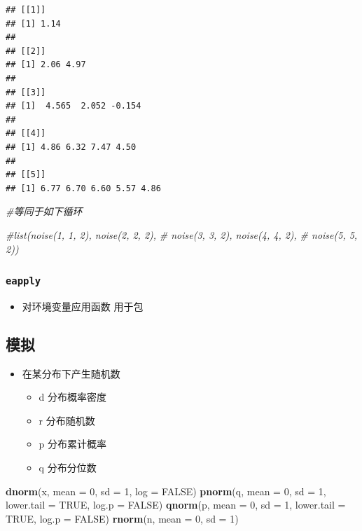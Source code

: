 \documentclass[]{book}
\newenvironment{Shaded}{\begin{snugshade}}{\end{snugshade}}
\newcommand{\CommentTok}[1]{\textcolor[rgb]{0.56,0.35,0.01}{\textit{#1}}}
\newcommand{\DataTypeTok}[1]{\textcolor[rgb]{0.13,0.29,0.53}{#1}}
\newcommand{\DecValTok}[1]{\textcolor[rgb]{0.00,0.00,0.81}{#1}}
\newcommand{\KeywordTok}[1]{\textcolor[rgb]{0.13,0.29,0.53}{\textbf{#1}}}
\newcommand{\NormalTok}[1]{#1}
\newcommand{\OtherTok}[1]{\textcolor[rgb]{0.56,0.35,0.01}{#1}}
\providecommand{\tightlist}{%
  \setlength{\itemsep}{0pt}\setlength{\parskip}{0pt}}
\begin{document}
\begin{verbatim}
## [[1]]
## [1] 1.14
## 
## [[2]]
## [1] 2.06 4.97
## 
## [[3]]
## [1]  4.565  2.052 -0.154
## 
## [[4]]
## [1] 4.86 6.32 7.47 4.50
## 
## [[5]]
## [1] 6.77 6.70 6.60 5.57 4.86
\end{verbatim}

\begin{Shaded}
\begin{Highlighting}[]
\CommentTok{#等同于如下循环}

\CommentTok{#list(noise(1, 1, 2), noise(2, 2, 2),}
\CommentTok{#    noise(3, 3, 2), noise(4, 4, 2),}
\CommentTok{#    noise(5, 5, 2))}
\end{Highlighting}
\end{Shaded}

\hypertarget{eapply}{%
\subsubsection{\texorpdfstring{\texttt{eapply}}{eapply}}\label{eapply}}

\begin{itemize}
\tightlist
\item
  对环境变量应用函数 用于包
\end{itemize}

\hypertarget{ux6a21ux62df}{%
\subsection{模拟}\label{ux6a21ux62df}}

\begin{itemize}
\tightlist
\item
  在某分布下产生随机数

  \begin{itemize}
  \tightlist
  \item
    d 分布概率密度
  \item
    r 分布随机数
  \item
    p 分布累计概率
  \item
    q 分布分位数
  \end{itemize}
\end{itemize}

\begin{Shaded}
\begin{Highlighting}[]
\KeywordTok{dnorm}\NormalTok{(x, }\DataTypeTok{mean =} \DecValTok{0}\NormalTok{, }\DataTypeTok{sd =} \DecValTok{1}\NormalTok{, }\DataTypeTok{log =} \OtherTok{FALSE}\NormalTok{)}
\KeywordTok{pnorm}\NormalTok{(q, }\DataTypeTok{mean =} \DecValTok{0}\NormalTok{, }\DataTypeTok{sd =} \DecValTok{1}\NormalTok{, }\DataTypeTok{lower.tail =} \OtherTok{TRUE}\NormalTok{, }\DataTypeTok{log.p =} \OtherTok{FALSE}\NormalTok{)}
\KeywordTok{qnorm}\NormalTok{(p, }\DataTypeTok{mean =} \DecValTok{0}\NormalTok{, }\DataTypeTok{sd =} \DecValTok{1}\NormalTok{, }\DataTypeTok{lower.tail =} \OtherTok{TRUE}\NormalTok{, }\DataTypeTok{log.p =} \OtherTok{FALSE}\NormalTok{)}
\KeywordTok{rnorm}\NormalTok{(n, }\DataTypeTok{mean =} \DecValTok{0}\NormalTok{, }\DataTypeTok{sd =} \DecValTok{1}\NormalTok{)}
\end{Highlighting}
\end{Shaded}
\end{document}

